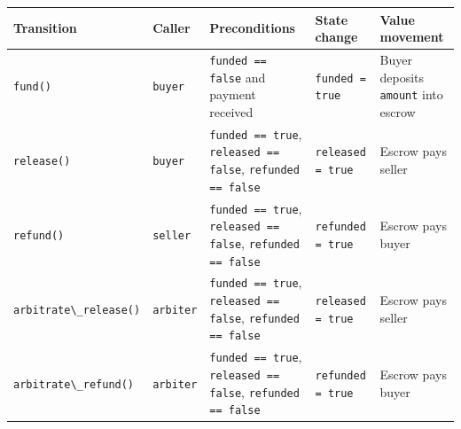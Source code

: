 {\def\LTcaptype{none} %
\begin{longtable}[]{@{}
  >{\raggedright\arraybackslash}p{}
  >{\raggedright\arraybackslash}p{}
  >{\raggedright\arraybackslash}p{}
  >{\raggedright\arraybackslash}p{}
  >{\raggedright\arraybackslash}p{}@{}}
\toprule\noalign{}
\begin{minipage}[b]{\linewidth}\raggedright
Transition
\end{minipage} & \begin{minipage}[b]{\linewidth}\raggedright
Caller
\end{minipage} & \begin{minipage}[b]{\linewidth}\raggedright
Preconditions
\end{minipage} & \begin{minipage}[b]{\linewidth}\raggedright
State change
\end{minipage} & \begin{minipage}[b]{\linewidth}\raggedright
Value movement
\end{minipage} \\
\midrule\noalign{}
\endhead
\bottomrule\noalign{}
\endlastfoot
\passthrough{\lstinline!fund()!} & \passthrough{\lstinline!buyer!} &
\passthrough{\lstinline!funded == false!} and payment received &
\passthrough{\lstinline!funded = true!} & Buyer deposits
\passthrough{\lstinline!amount!} into escrow \\
\passthrough{\lstinline!release()!} & \passthrough{\lstinline!buyer!} &
\passthrough{\lstinline!funded == true!},
\passthrough{\lstinline!released == false!},
\passthrough{\lstinline!refunded == false!} &
\passthrough{\lstinline!released = true!} & Escrow pays seller \\
\passthrough{\lstinline!refund()!} & \passthrough{\lstinline!seller!} &
\passthrough{\lstinline!funded == true!},
\passthrough{\lstinline!released == false!},
\passthrough{\lstinline!refunded == false!} &
\passthrough{\lstinline!refunded = true!} & Escrow pays buyer \\
\passthrough{\lstinline!arbitrate\_release()!} &
\passthrough{\lstinline!arbiter!} &
\passthrough{\lstinline!funded == true!},
\passthrough{\lstinline!released == false!},
\passthrough{\lstinline!refunded == false!} &
\passthrough{\lstinline!released = true!} & Escrow pays seller \\
\passthrough{\lstinline!arbitrate\_refund()!} &
\passthrough{\lstinline!arbiter!} &
\passthrough{\lstinline!funded == true!},
\passthrough{\lstinline!released == false!},
\passthrough{\lstinline!refunded == false!} &
\passthrough{\lstinline!refunded = true!} & Escrow pays buyer \\
\end{longtable}
}

